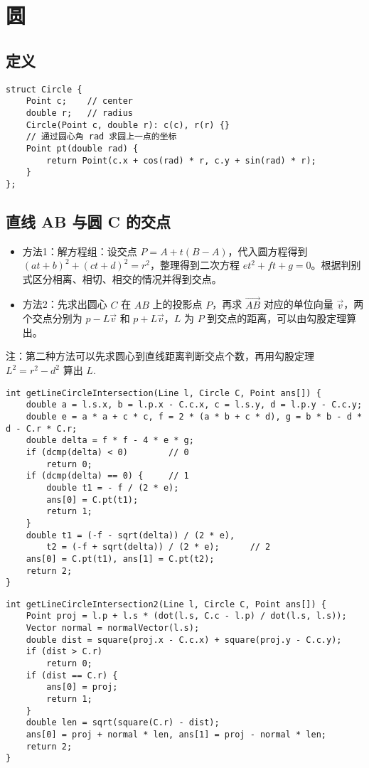 \section{圆}
\subsection{定义}
\begin{verbatim}
struct Circle {
    Point c;    // center
    double r;   // radius
    Circle(Point c, double r): c(c), r(r) {}
    // 通过圆心角 rad 求圆上一点的坐标 
    Point pt(double rad) {
        return Point(c.x + cos(rad) * r, c.y + sin(rad) * r);
    }
};
\end{verbatim}

\subsection{直线 AB 与圆 C 的交点}

\begin{itemize}
    \item 方法1：解方程组：设交点 $P=A+t(B-A)$，代入圆方程得到 $(at+b)^2+(ct+d)^2=r^2$，整理得到二次方程 $et^2+ft+g=0$。根据判别式区分相离、相切、相交的情况并得到交点。
    \item 方法2：先求出圆心 $C$ 在 $AB$ 上的投影点 $P$，再求 $\vec{AB}$ 对应的单位向量 $\vec{v}$，两个交点分别为 $p-L\vec{v}$ 和 $p+L\vec{v}$，$L$ 为 $P$ 到交点的距离，可以由勾股定理算出。
\end{itemize}

\noindent 注：第二种方法可以先求圆心到直线距离判断交点个数，再用勾股定理 $L^2=r^2-d^2$ 算出 $L$.

\begin{verbatim}
int getLineCircleIntersection(Line l, Circle C, Point ans[]) {
    double a = l.s.x, b = l.p.x - C.c.x, c = l.s.y, d = l.p.y - C.c.y;
    double e = a * a + c * c, f = 2 * (a * b + c * d), g = b * b - d * d - C.r * C.r;
    double delta = f * f - 4 * e * g;
    if (dcmp(delta) < 0)        // 0
        return 0;
    if (dcmp(delta) == 0) {     // 1
        double t1 = - f / (2 * e);
        ans[0] = C.pt(t1);
        return 1;
    }
    double t1 = (-f - sqrt(delta)) / (2 * e),
        t2 = (-f + sqrt(delta)) / (2 * e);      // 2
    ans[0] = C.pt(t1), ans[1] = C.pt(t2);
    return 2;
}
\end{verbatim}

\begin{verbatim}
int getLineCircleIntersection2(Line l, Circle C, Point ans[]) {
    Point proj = l.p + l.s * (dot(l.s, C.c - l.p) / dot(l.s, l.s));
    Vector normal = normalVector(l.s);
    double dist = square(proj.x - C.c.x) + square(proj.y - C.c.y);
    if (dist > C.r)
        return 0;
    if (dist == C.r) {
        ans[0] = proj;
        return 1;
    }
    double len = sqrt(square(C.r) - dist);
    ans[0] = proj + normal * len, ans[1] = proj - normal * len;
    return 2;
}
\end{verbatim}

